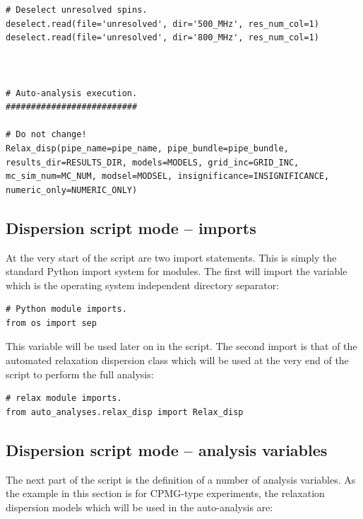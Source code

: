 \begin{lstlisting}
# Deselect unresolved spins.
deselect.read(file='unresolved', dir='500_MHz', res_num_col=1)
deselect.read(file='unresolved', dir='800_MHz', res_num_col=1)



# Auto-analysis execution.
##########################

# Do not change!
Relax_disp(pipe_name=pipe_name, pipe_bundle=pipe_bundle, results_dir=RESULTS_DIR, models=MODELS, grid_inc=GRID_INC, mc_sim_num=MC_NUM, modsel=MODSEL, insignificance=INSIGNIFICANCE, numeric_only=NUMERIC_ONLY)
\end{lstlisting}



\subsection{Dispersion script mode -- imports} \label{sect: dispersion script imports}

At the very start of the script are two import statements.
This is simply the standard Python import system for modules.
The first will import the  variable which is the operating system independent directory separator:

\begin{lstlisting}[firstnumber=4]
# Python module imports.
from os import sep
\end{lstlisting}

This  variable will be used later on in the script.
The second import is that of the automated relaxation dispersion class  which will be used at the very end of the script to perform the full analysis:

\begin{lstlisting}[firstnumber=7]
# relax module imports.
from auto_analyses.relax_disp import Relax_disp
\end{lstlisting}



\subsection{Dispersion script mode -- analysis variables} \label{sect: dispersion script variables}

The next part of the script is the definition of a number of analysis variables.
As the example in this section is for CPMG-type experiments, the relaxation dispersion models which will be used in the auto-analysis are:

